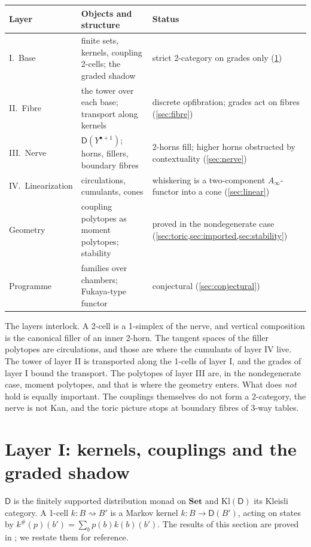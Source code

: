 \documentclass[11pt]{article}
\theoremstyle{definition}
\theoremstyle{remark}
\newcommand{\D}{\mathsf{D}}
\newcommand{\Kl}{\mathrm{Kl}}
\begin{document}
\begin{center}\small
\begin{tabular}{@{}R{0.17\textwidth}R{0.42\textwidth}R{0.33\textwidth}@{}}
\toprule
Layer & Objects and structure & Status\\
\midrule
I.\ Base & finite sets, kernels, coupling 2-cells; the graded shadow & strict 2-category on grades only
(\cref{sec:base})\\
II.\ Fibre & the tower over each base; transport along kernels & discrete opfibration; grades act on fibres
(\cref{sec:fibre})\\
III.\ Nerve & $\D(Y^{\bullet+1})$; horns, fillers, boundary fibres & 2-horns fill; higher horns obstructed by
contextuality (\cref{sec:nerve})\\
IV.\ Linearization & circulations, cumulants, cones & whiskering is a two-component $A_\infty$-functor into a cone
(\cref{sec:linear})\\
Geometry & coupling polytopes as moment polytopes; stability & proved in the nondegenerate case
(\cref{sec:toric,sec:imported,sec:stability})\\
Programme & families over chambers; Fukaya-type functor & conjectural (\cref{sec:conjectural})\\
\bottomrule
\end{tabular}
\end{center}

The layers interlock. A 2-cell is a 1-simplex of the nerve, and vertical composition is the canonical filler of
an inner 2-horn. The tangent spaces of the filler polytopes are circulations, and those are where the cumulants
of layer IV live. The tower of layer II is transported along the 1-cells of layer I, and the grades of layer I
bound the transport. The polytopes of layer III are, in the nondegenerate case, moment polytopes, and that is
where the geometry enters. What does \emph{not} hold is equally important. The couplings themselves do not form a
2-category, the nerve is not Kan, and the toric picture stops at boundary fibres of 3-way tables.

\section{Layer I: kernels, couplings and the graded shadow}\label{sec:base}

$\D$ is the finitely supported distribution monad on $\mathbf{Set}$ and $\Kl(\D)$ its Kleisli category.
A 1-cell $k\colon B\rightsquigarrow B'$ is a Markov kernel $k\colon B\to\D(B')$, acting on states by
$k^\#(p)(b')=\sum_bp(b)k(b)(b')$. The results of this section are proved in
\cite[\S7]{Awasthi-Attribution}; we restate them for reference.
\end{document}
